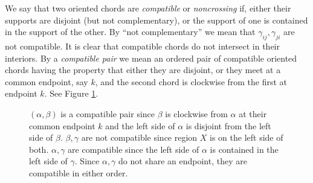 \documentclass[11pt]{amsart}
\theoremstyle{definition}
\theoremstyle{remark}
\numberwithin{equation}{section}
\begin{document}
We say that two oriented chords are \emph{compatible} or \emph{noncrossing} if, either their supports are disjoint (but not complementary), or the support of one is contained in the support of the other. By ``not complementary'' we mean that $\gamma_{ij},\gamma_{ji}$ are not compatible. It is clear that compatible chords do not intersect in their interiors. By a \emph{compatible pair} we mean an ordered pair of compatible oriented chords having the property that either they are disjoint, or they meet at a common endpoint, say $k$, and the second chord is clockwise from the first at endpoint $k$. See Figure \ref{fig: compatible chords}.


%
\begin{figure}[htbp]
\begin{center}
\caption{$(\alpha,\beta)$ is a compatible pair since $\beta$ is clockwise from $\alpha$ at their common endpoint $k$ and the left side of $\alpha$ is disjoint from the left side of $\beta$. $\beta,\gamma$ are not compatible since region $X$ is on the left side of both. $\alpha,\gamma$ are compatible since the left side of $\alpha$ is contained in the left side of $\gamma$. Since $\alpha,\gamma$ do not share an endpoint, they are compatible in either order.}
\label{fig: compatible chords}
\end{center}
\end{figure}
\end{document}
